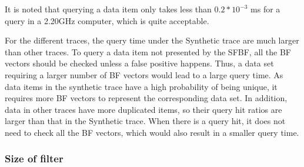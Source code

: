 \documentclass[10pt,journal,letterpaper]{IEEEtran}
\newcommand{\note}[1]{{\sffamily\itshape\bfseries\uline{#1}}}
\begin{document}
It is noted that querying a data item  only takes  less than $0.2*10^{-3}$ ms for a query in a 2.20GHz computer, which is quite acceptable.

For the different traces, the query time under the Synthetic trace are much larger than other traces. To query a data item not presented by the SFBF, all the BF vectors should be checked unless a false positive happens.
Thus, a data set requiring a larger number of BF vectors would lead to a large query time. As data items in the synthetic trace have a high probability of being  unique, it requires more BF vectors to represent the corresponding data set.  In addition,  data in other traces have more duplicated items, so their query hit ratios are larger than that in the Synthetic trace. When there is a query hit, it does not need to check all the BF vectors, which would also result in a smaller query time.



\subsubsection{Size of filter}
\end{document}
